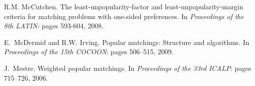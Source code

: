 \documentclass[11pt]{llncs}
\begin{document}
\begin{thebibliography}{10}
R.M. McCutchen.
\newblock The least-unpopularity-factor and least-unpopularity-margin criteria for matching problems with one-sided preferences.
\newblock In {\em Proceedings of the 8th LATIN:} pages 593-604, 2008.

E.~McDermid and R.W. Irving.
\newblock Popular matchings: Structure and algorithms.
\newblock In {\em Proceedings of the 15th COCOON}: pages 506--515,  2009.

J.~Mestre.
\newblock Weighted popular matchings.
\newblock In {\em Proceedings of the 33rd ICALP}: pages 715--726, 2006.
\end{thebibliography}
\end{document}
